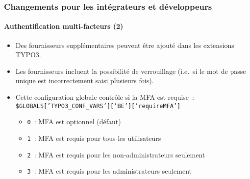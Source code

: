 %

\begin{frame}[fragile]
	\frametitle{Changements pour les intégrateurs et développeurs}
	\framesubtitle{Authentification multi-facteurs (2)}

	\begin{itemize}

		\item Des fournisseurs supplémentaires peuvent être ajouté dans les extensions TYPO3.

		\item Les fournisseurs incluent la possibilité de verrouillage
			(i.e.\ si le mot de passe unique est incorrectement saisi plusieurs fois).

		\item Cette configuration globale contrôle si la MFA est requise~:\newline
			\smaller\texttt{\$GLOBALS['TYPO3\_CONF\_VARS']['BE']['requireMFA']}\normalsize

			\begin{itemize}
				\item \texttt{0}~: MFA est optionnel (défaut)
				\item \texttt{1}~: MFA est requis pour tous les utilisateurs
				\item \texttt{2}~: MFA est requis pour les non-administrateurs seulement
				\item \texttt{3}~: MFA est requis pour les administrateurs seulement
			\end{itemize}

	\end{itemize}

\end{frame}

